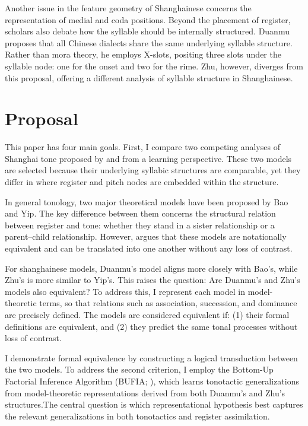 \documentclass[11pt]{article}
\begin{document}
Another issue in the feature geometry of Shanghainese concerns the 
representation of medial and coda positions. Beyond the placement of register, 
scholars also debate how the syllable should be internally structured. Duanmu 
proposes that all Chinese dialects share the same underlying syllable 
structure. Rather than mora theory, he employs X-slots, positing three slots 
under the syllable node: one for the onset and two for the rime. Zhu, however, 
diverges from this proposal, offering a different analysis of syllable 
structure in Shanghainese.

\section{Proposal}
This paper has four main goals. First, I compare two competing analyses of 
Shanghai tone proposed by \citet{duanmu1988} and \citet{zhu1999shanghai} 
from a learning perspective. These two models are selected because their 
underlying syllabic structures are comparable, yet they differ in where 
register and pitch nodes are embedded within the structure.

In general tonology, two major theoretical models have been proposed by 
Bao and Yip. The key difference between them concerns the structural 
relation between register and tone: whether they stand in a sister relationship 
or a parent–child relationship. However, \citet{oakdenNotationalEquivalenceTonal2020} 
argues that these models are notationally equivalent and can be translated into 
one another without any loss of contrast. 

For shanghainese models, Duanmu’s model aligns more closely with Bao’s, 
while Zhu’s is more similar to Yip’s. This raises the question: Are 
Duanmu’s and Zhu’s models also equivalent? To address this, I represent 
each model in model-theoretic terms, so that relations such as 
association, succession, and dominance are precisely defined. The 
models are considered equivalent if: (1) their formal definitions are 
equivalent, and (2) they predict the same tonal processes without 
loss of contrast.

I demonstrate formal equivalence by constructing a logical transduction between the two models. To address the second criterion, I employ the Bottom-Up Factorial Inference Algorithm (BUFIA; \citealt{chandleeBufia2019}), which learns tonotactic generalizations from model-theoretic representations derived from both Duanmu’s and Zhu’s structures.The central question is which representational hypothesis best captures the relevant generalizations in both tonotactics and register assimilation.
\end{document}
